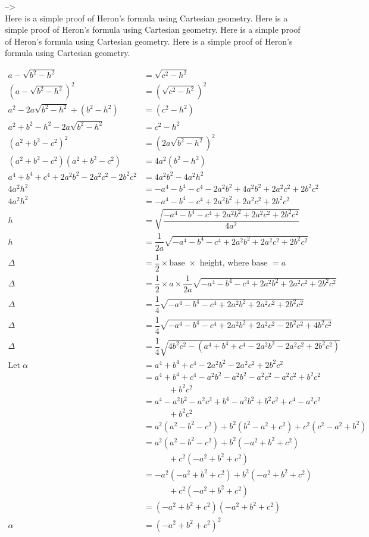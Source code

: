 \documentclass[
]{book}
\begin{document}
--\textgreater{}\\
Here is a simple proof of Heron's formula using Cartesian geometry. Here is a simple proof of Heron's formula using Cartesian geometry. Here is a simple proof of Heron's formula using Cartesian geometry. Here is a simple proof of Heron's formula using Cartesian geometry.

\[
\begin{aligned}
a - \sqrt{b^2 - h^2} &= \sqrt{c^2 - h^2} \\
(a - \sqrt{b^2 - h^2})^2 &= (\sqrt{c^2 - h^2})^2 \\
a^2 - 2a\sqrt{b^2 - h^2} + (b^2 - h^2) &= (c^2 - h^2) \\
a^2 + b^2 - h^2 - 2a\sqrt{b^2 - h^2} &= c^2 - h^2 \\
(a^2 + b^2 - c^2)^2 &= (2a\sqrt{b^2 - h^2})^2 \\
(a^2 + b^2 - c^2)(a^2 + b^2 - c^2) &= 4a^2(b^2 - h^2) \\
a^4 + b^4 + c^4 + 2a^2b^2 - 2a^2c^2 - 2b^2c^2 &= 4a^2b^2 - 4a^2h^2 \\
4a^2h^2 &= -a^4 - b^4 - c^4 - 2a^2b^2 + 4a^2b^2 + 2a^2c^2 + 2b^2c^2 \\
4a^2h^2 &= -a^4 - b^4 - c^4 + 2a^2b^2 + 2a^2c^2 + 2b^2c^2 \\
h &= \sqrt{\dfrac{-a^4 - b^4 - c^4 + 2a^2b^2 + 2a^2c^2 + 2b^2c^2}{4a^2}} \\
h &= \dfrac{1}{2a} \sqrt{-a^4 - b^4 - c^4 + 2a^2b^2 + 2a^2c^2 + 2b^2c^2} \\
\Delta &= \dfrac{1}{2} \times \text{base $\times$ height, where base $= a$} \\
\Delta &= \dfrac{1}{2} \times a \times \dfrac{1}{2a} \sqrt{-a^4 - b^4 - c^4 + 2a^2b^2 + 2a^2c^2 + 2b^2c^2} \\
\Delta &= \dfrac{1}{4} \sqrt{-a^4 - b^4 - c^4 + 2a^2b^2 + 2a^2c^2 + 2b^2c^2} \\
\Delta &= \dfrac{1}{4} \sqrt{-a^4 - b^4 - c^4 + 2a^2b^2 + 2a^2c^2 - 2b^2c^2 + 4b^2c^2} \\
\Delta &= \dfrac{1}{4} \sqrt{4b^2c^2 - (a^4 + b^4 + c^4 - 2a^2b^2 - 2a^2c^2 + 2b^2c^2)} \\
\text{Let}\; \alpha &= a^4 + b^4 + c^4 - 2a^2b^2 - 2a^2c^2 + 2b^2c^2 \\
&= a^4 + b^4 + c^4 - a^2b^2 - a^2b^2 - a^2c^2 - a^2c^2 + b^2c^2 \\
    &\qquad\quad + b^2c^2 \\
&= a^4 - a^2b^2 - a^2c^2 + b^4 - a^2b^2 + b^2c^2 + c^4 - a^2c^2 \\
    &\qquad\quad + b^2c^2 \\
&= a^2(a^2 - b^2 - c^2) + b^2(b^2 - a^2 + c^2) + c^2(c^2 - a^2 + b^2) \\
&= a^2(a^2 - b^2 - c^2) + b^2(-a^2 + b^2 + c^2) \\
        &\qquad\quad + c^2(-a^2 + b^2 + c^2) \\
&= -a^2(-a^2 + b^2 + c^2) + b^2(-a^2 + b^2 + c^2) \\
        &\qquad\quad + c^2(-a^2 + b^2 + c^2) \\
&= (-a^2 + b^2 + c^2)(-a^2 + b^2 + c^2) \\
\alpha &= (-a^2 + b^2 + c^2)^2
\end{aligned}
\]
\end{document}
